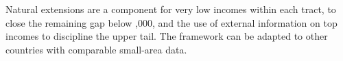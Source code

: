 \documentclass[letterpaper,11pt,leqno]{article}
\begin{document}
Natural extensions are a component for very low incomes within each tract, to close the remaining gap below ,000, and the use of external information on top incomes to discipline the upper tail. The framework can be adapted to other countries with comparable small-area data.

\newpage
\singlespacing

\end{document}
